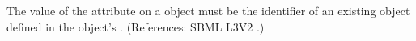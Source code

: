 The value of the attribute  on a \Model object must
be the identifier of an existing \Parameter object defined in the \Model
object's \ListOfParameters.  (References: SBML L3V2
.)
